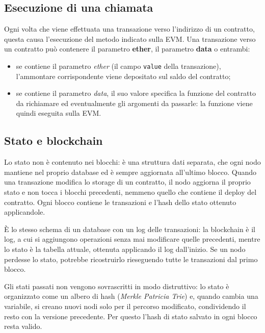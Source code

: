 \documentclass[a4paper, 11pt, oneside]{book}
\newcommand{\cod}[1]{\texttt{#1}} %
\begin{document}
	\subsection{Esecuzione di una chiamata}
	Ogni volta che viene effettuata una transazione verso l'indirizzo di un contratto,
	questa causa l'esecuzione del metodo indicato sulla EVM. Una transazione verso un
	contratto può contenere il parametro \textbf{ether}, il parametro \textbf{data} o
	entrambi:
	\begin{itemize}
		\item se contiene il parametro \textit{ether} (il campo \cod{value} della
			transazione), l'ammontare corrispondente viene depositato sul saldo del
			contratto;
		\item se contiene il parametro \textit{data}, il suo valore specifica la funzione
			del contratto da richiamare ed eventualmente gli argomenti da passarle: la
			funzione viene quindi eseguita sulla EVM.
	\end{itemize}

	\subsection{Stato e blockchain}
	Lo stato non è contenuto nei blocchi: è una struttura dati separata, che ogni nodo
	mantiene nel proprio database ed è sempre aggiornata all'ultimo blocco. Quando una
	transazione modifica lo storage di un contratto, il nodo aggiorna il proprio stato e
	non tocca i blocchi precedenti, nemmeno quello che contiene il deploy del contratto.
	Ogni blocco contiene le transazioni e l'hash dello stato ottenuto applicandole.

	È lo stesso schema di un database con un log delle transazioni: la blockchain è il
	log, a cui si aggiungono operazioni senza mai modificare quelle precedenti, mentre lo
	stato è la tabella attuale, ottenuta applicando il log dall'inizio. Se un nodo
	perdesse lo stato, potrebbe ricostruirlo rieseguendo tutte le transazioni dal primo
	blocco.

	\begin{nota}
		Gli stati passati non vengono sovrascritti in modo distruttivo: lo stato è
		organizzato come un albero di hash (\textit{Merkle Patricia Trie}) e, quando cambia
		una variabile, si creano nuovi nodi solo per il percorso modificato, condividendo
		il resto con la versione precedente. Per questo l'hash di stato salvato in ogni
		blocco resta valido.
	\end{nota}
\end{document}

